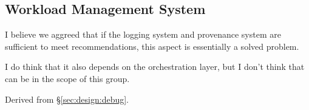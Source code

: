 \subsection{Workload Management System}
\label{sec:comp:workload}


I believe we aggreed that if the logging system and provenance system are sufficient to meet recommendations, this aspect is essentially a solved problem.

I do think that it also depends on the orchestration layer, but I don't think that can be in the scope of this group.

Derived from \S\ref{sec:design:debug}.
